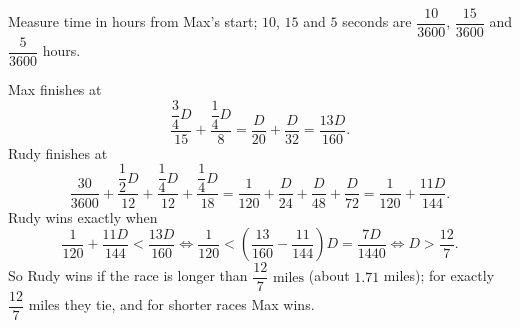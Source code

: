 Measure time in hours from Max's start; $10$, $15$ and $5$ seconds are $\dfrac{10}{3600}$, $\dfrac{15}{3600}$ and $\dfrac{5}{3600}$ hours.

Max finishes at
\[\dfrac{\dfrac34D}{15}+\dfrac{\dfrac14D}{8}=\dfrac{D}{20}+\dfrac{D}{32}=\dfrac{13D}{160}.\]
Rudy finishes at
\[\dfrac{30}{3600}+\dfrac{\dfrac12D}{12}+\dfrac{\dfrac14D}{12}+\dfrac{\dfrac14D}{18}=\dfrac{1}{120}+\dfrac{D}{24}+\dfrac{D}{48}+\dfrac{D}{72}=\dfrac{1}{120}+\dfrac{11D}{144}.\]
Rudy wins exactly when
\[\dfrac{1}{120}+\dfrac{11D}{144}<\dfrac{13D}{160}\iff\dfrac{1}{120}<\left(\dfrac{13}{160}-\dfrac{11}{144}\right)D=\dfrac{7D}{1440}\iff D>\dfrac{12}{7}.\]
So Rudy wins if the race is longer than $\boxed{\dfrac{12}{7}\text{ miles}}$ (about $1.71$ miles); for exactly $\dfrac{12}{7}$ miles they tie, and for shorter races Max wins.
